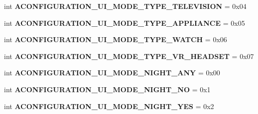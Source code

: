 \begin{DoxyCompactItemize}
\item 
\mbox{\label{classconfiguration_1_1AConfiguration_a8ca1e580ef17b484aa62846281ffcd2f}} 
int {\bfseries A\+C\+O\+N\+F\+I\+G\+U\+R\+A\+T\+I\+O\+N\+\_\+\+U\+I\+\_\+\+M\+O\+D\+E\+\_\+\+T\+Y\+P\+E\+\_\+\+T\+E\+L\+E\+V\+I\+S\+I\+ON} = 0x04
\item 
\mbox{\label{classconfiguration_1_1AConfiguration_a70ddf89b3a204845387387b200b7c282}} 
int {\bfseries A\+C\+O\+N\+F\+I\+G\+U\+R\+A\+T\+I\+O\+N\+\_\+\+U\+I\+\_\+\+M\+O\+D\+E\+\_\+\+T\+Y\+P\+E\+\_\+\+A\+P\+P\+L\+I\+A\+N\+CE} = 0x05
\item 
\mbox{\label{classconfiguration_1_1AConfiguration_a47f3adc78556f92028820bc53193275b}} 
int {\bfseries A\+C\+O\+N\+F\+I\+G\+U\+R\+A\+T\+I\+O\+N\+\_\+\+U\+I\+\_\+\+M\+O\+D\+E\+\_\+\+T\+Y\+P\+E\+\_\+\+W\+A\+T\+CH} = 0x06
\item 
\mbox{\label{classconfiguration_1_1AConfiguration_a1a6bdc1d95b34e38d68dc7a2111fb128}} 
int {\bfseries A\+C\+O\+N\+F\+I\+G\+U\+R\+A\+T\+I\+O\+N\+\_\+\+U\+I\+\_\+\+M\+O\+D\+E\+\_\+\+T\+Y\+P\+E\+\_\+\+V\+R\+\_\+\+H\+E\+A\+D\+S\+ET} = 0x07
\item 
\mbox{\label{classconfiguration_1_1AConfiguration_a1abd5df19756bf7daf028ac44dfc8f30}} 
int {\bfseries A\+C\+O\+N\+F\+I\+G\+U\+R\+A\+T\+I\+O\+N\+\_\+\+U\+I\+\_\+\+M\+O\+D\+E\+\_\+\+N\+I\+G\+H\+T\+\_\+\+A\+NY} = 0x00
\item 
\mbox{\label{classconfiguration_1_1AConfiguration_aa975e882f37aaad6b8d368fd8f0adbaa}} 
int {\bfseries A\+C\+O\+N\+F\+I\+G\+U\+R\+A\+T\+I\+O\+N\+\_\+\+U\+I\+\_\+\+M\+O\+D\+E\+\_\+\+N\+I\+G\+H\+T\+\_\+\+NO} = 0x1
\item 
\mbox{\label{classconfiguration_1_1AConfiguration_abfd5e4e768c49e52fa62e5d432abe371}} 
int {\bfseries A\+C\+O\+N\+F\+I\+G\+U\+R\+A\+T\+I\+O\+N\+\_\+\+U\+I\+\_\+\+M\+O\+D\+E\+\_\+\+N\+I\+G\+H\+T\+\_\+\+Y\+ES} = 0x2
\item 
\mbox{\label{classconfiguration_1_1AConfiguration_a05cdd0f1c7fac18d619a59e0c82b6002}} 

\end{DoxyCompactItemize}
